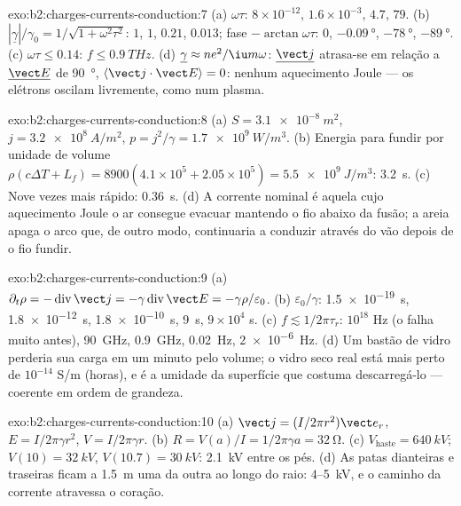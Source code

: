 \begin{solution}{exo:b2:charges-currents-conduction:7}
(a) $\omega\tau$: $8 \times 10^{-12}$, $1.6 \times 10^{-3}$, $4.7$, $79$. (b) $|\underline\gamma|/\gamma_0 =
1/\sqrt{1 + \omega^2\tau^2}$: $1$, $1$, $0.21$, $0.013$; fase $-\arctan\omega\tau$: $0$,
$-\qty{0.09}{\degree}$, $-\qty{78}{\degree}$, $-\qty{89}{\degree}$. (c) $\omega\tau \le 0.14$: $f \le
\qty{0.9}{THz}$. (d) $\underline\gamma \approx ne^2/\iu m\omega$: $\underline{\vect j}$ atrasa-se em relação a
$\underline{\vect E}$ de \qty{90}{\degree}, $\langle\vect j\cdot\vect E\rangle = 0$: nenhum aquecimento
Joule --- os elétrons oscilam livremente, como num plasma.
\end{solution}

\begin{solution}{exo:b2:charges-currents-conduction:8}
(a) $S = \qty{3.1e-8}{m^2}$, $j = \qty{3.2e8}{A/m^2}$, $p = j^2/\gamma = \qty{1.7e9}{W/m^3}$.
(b) Energia para fundir por unidade de volume $\rho(c\Delta T + L_f) = 8900(4.1 \times 10^5 + 2.05 \times
10^5) = \qty{5.5e9}{J/m^3}$: \qty{3.2}{s}. (c) Nove vezes mais rápido: \qty{0.36}{s}. (d) A
corrente nominal é aquela cujo aquecimento Joule o ar consegue evacuar
mantendo o fio abaixo da fusão; a areia apaga o arco que, de outro modo,
continuaria a conduzir através do vão depois de o fio fundir.
\end{solution}

\begin{solution}{exo:b2:charges-currents-conduction:9}
(a) $\partial_t\rho = -\operatorname{div}\vect j = -\gamma\operatorname{div}\vect E = -\gamma\rho/
\varepsilon_0$. (b) $\varepsilon_0/\gamma$: \qty{1.5e-19}{s}, \qty{1.8e-12}{s}, \qty{1.8e-10}{s},
\qty{9}{s}, $9 \times 10^4$ s. (c) $f \lesssim 1/2\pi\tau_r$: $10^{18}$ Hz (o 
falha muito antes), \qty{90}{GHz}, \qty{0.9}{GHz}, \qty{0.02}{Hz}, \qty{2e-6}{Hz}. (d)
Um bastão de vidro perderia sua carga em um minuto pelo volume;
o vidro seco real está mais perto de $10^{-14}$ S/m (horas), e é a umidade
da superfície que costuma descarregá-lo --- coerente em ordem de
grandeza.
\end{solution}

\begin{solution}{exo:b2:charges-currents-conduction:10}
(a) $\vect j = (I/2\pi r^2)\vect e_r$, $E = I/2\pi\gamma r^2$, $V = I/2\pi\gamma r$. (b) $R = V(a)
/I = 1/2\pi\gamma a = \qty{32}{\ohm}$. (c) $V_{\text{haste}} = \qty{640}{kV}$; $V(10) = \qty{32}{kV}$,
$V(10.7) = \qty{30}{kV}$: \qty{2.1}{kV} entre os pés. (d) As patas dianteiras e traseiras
ficam a \qty{1.5}{m} uma da outra ao longo do raio: $4$--\qty{5}{kV}, e o caminho
da corrente atravessa o coração.
\end{solution}

